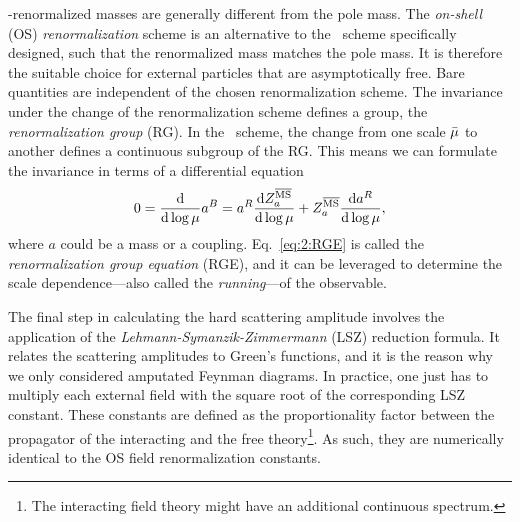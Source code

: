 \MS-renormalized masses are generally different from the pole mass. The \textit{on-shell} (\acs{OS}) \textit{renormalization} scheme is an alternative to the \MS\ scheme specifically designed, such that the renormalized mass matches the pole mass. It is therefore the suitable choice for external particles that are asymptotically free. Bare quantities are independent of the chosen renormalization scheme. The invariance under the change of the renormalization scheme defines a group, the \textit{renormalization group} (\acs{RG}). In the \MS\ scheme, the change from one scale $\bar{\mu}$ to another defines a continuous subgroup of the \acs{RG}. This means we can formulate the invariance in terms of a differential equation
\begin{equation}
0 = \frac{\mathrm{d}}{\mathrm{d} \log \mu} a^B  = a^R \frac{\mathrm{d} Z^{\overline{\mathrm{MS}}}_a}{\mathrm{d} \log \mu} + Z^{\overline{\mathrm{MS}}}_a \frac{\mathrm{d} a^R}{\mathrm{d} \log \mu},
\label{eq:2:RGE}
\end{equation}
where $a$ could be a mass or a coupling. Eq.~\eqref{eq:2:RGE} is called the \textit{renormalization group equation} (\acs{RGE}), and it can be leveraged to determine the scale dependence---also called the \textit{running}---of the observable.

The final step in calculating the hard scattering amplitude involves the application of the \textit{Lehmann-Symanzik-Zimmermann} (LSZ) reduction formula. It relates the scattering amplitudes to Green's functions, and it is the reason why we only considered amputated Feynman diagrams. In practice, one just has to multiply each external field with the square root of the corresponding LSZ constant. These constants are defined as the proportionality factor between the propagator of the interacting and the free theory\footnote{The interacting field theory might have an additional continuous spectrum.}. As such, they are numerically identical to the \acs{OS} field renormalization constants.


